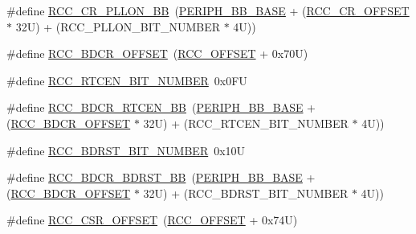 \begin{DoxyCompactItemize}
\item 
\#define \hyperlink{group___r_c_c___bit_address___alias_region_ga0b0a8f171b66cc0d767716ba23ad3c6f}{R\+C\+C\+\_\+\+C\+R\+\_\+\+P\+L\+L\+O\+N\+\_\+\+BB}~(\hyperlink{group___peripheral__memory__map_gaed7efc100877000845c236ccdc9e144a}{P\+E\+R\+I\+P\+H\+\_\+\+B\+B\+\_\+\+B\+A\+SE} + (\hyperlink{group___r_c_c___bit_address___alias_region_ga6df8d81c05c07cb0c26bbf27ea7fe55c}{R\+C\+C\+\_\+\+C\+R\+\_\+\+O\+F\+F\+S\+ET} $\ast$ 32\+U) + (\+R\+C\+C\+\_\+\+P\+L\+L\+O\+N\+\_\+\+B\+I\+T\+\_\+\+N\+U\+M\+B\+E\+R $\ast$ 4\+U))
\item 
\#define \hyperlink{group___r_c_c___bit_address___alias_region_gaf234fe5d9628a3f0769721e76f83c566}{R\+C\+C\+\_\+\+B\+D\+C\+R\+\_\+\+O\+F\+F\+S\+ET}~(\hyperlink{group___r_c_c___bit_address___alias_region_ga539e07c3b3c55f1f1d47231341fb11e1}{R\+C\+C\+\_\+\+O\+F\+F\+S\+ET} + 0x70\+U)
\item 
\#define \hyperlink{group___r_c_c___bit_address___alias_region_gac4074d20c157f0892c6effb8bf22c8d7}{R\+C\+C\+\_\+\+R\+T\+C\+E\+N\+\_\+\+B\+I\+T\+\_\+\+N\+U\+M\+B\+ER}~0x0\+FU
\item 
\#define \hyperlink{group___r_c_c___bit_address___alias_region_ga583ba8653153b48a06473d0a331f781d}{R\+C\+C\+\_\+\+B\+D\+C\+R\+\_\+\+R\+T\+C\+E\+N\+\_\+\+BB}~(\hyperlink{group___peripheral__memory__map_gaed7efc100877000845c236ccdc9e144a}{P\+E\+R\+I\+P\+H\+\_\+\+B\+B\+\_\+\+B\+A\+SE} + (\hyperlink{group___r_c_c___bit_address___alias_region_gaf234fe5d9628a3f0769721e76f83c566}{R\+C\+C\+\_\+\+B\+D\+C\+R\+\_\+\+O\+F\+F\+S\+ET} $\ast$ 32\+U) + (\+R\+C\+C\+\_\+\+R\+T\+C\+E\+N\+\_\+\+B\+I\+T\+\_\+\+N\+U\+M\+B\+E\+R $\ast$ 4\+U))
\item 
\#define \hyperlink{group___r_c_c___bit_address___alias_region_ga68b0f7a13e733453c7efcd66a6ee251d}{R\+C\+C\+\_\+\+B\+D\+R\+S\+T\+\_\+\+B\+I\+T\+\_\+\+N\+U\+M\+B\+ER}~0x10U
\item 
\#define \hyperlink{group___r_c_c___bit_address___alias_region_ga5e5805d3c5b9ad3ebc13e030e5fdd86c}{R\+C\+C\+\_\+\+B\+D\+C\+R\+\_\+\+B\+D\+R\+S\+T\+\_\+\+BB}~(\hyperlink{group___peripheral__memory__map_gaed7efc100877000845c236ccdc9e144a}{P\+E\+R\+I\+P\+H\+\_\+\+B\+B\+\_\+\+B\+A\+SE} + (\hyperlink{group___r_c_c___bit_address___alias_region_gaf234fe5d9628a3f0769721e76f83c566}{R\+C\+C\+\_\+\+B\+D\+C\+R\+\_\+\+O\+F\+F\+S\+ET} $\ast$ 32\+U) + (\+R\+C\+C\+\_\+\+B\+D\+R\+S\+T\+\_\+\+B\+I\+T\+\_\+\+N\+U\+M\+B\+E\+R $\ast$ 4\+U))
\item 
\#define \hyperlink{group___r_c_c___bit_address___alias_region_ga63141585a221eed1fd009eb80e406619}{R\+C\+C\+\_\+\+C\+S\+R\+\_\+\+O\+F\+F\+S\+ET}~(\hyperlink{group___r_c_c___bit_address___alias_region_ga539e07c3b3c55f1f1d47231341fb11e1}{R\+C\+C\+\_\+\+O\+F\+F\+S\+ET} + 0x74\+U)

\end{DoxyCompactItemize}
